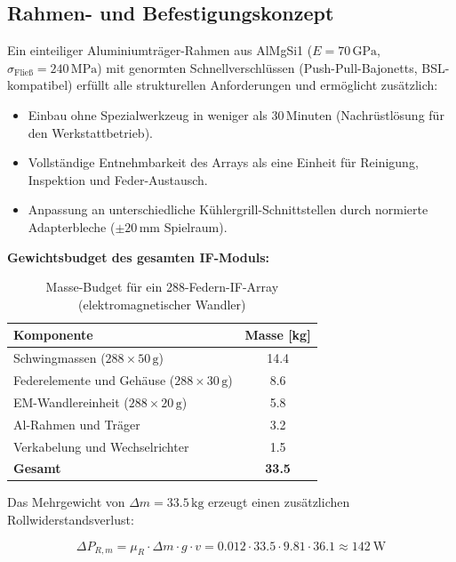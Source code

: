 ﻿\documentclass[12pt, a4paper]{report}
\theoremstyle{definition}
\theoremstyle{remark}
\begin{document}
\subsection{Rahmen- und Befestigungskonzept}

Ein einteiliger Aluminiumträger-Rahmen aus AlMgSi1 ($E = 70\,\text{GPa}$,
$\sigma_{\text{Fließ}} = 240\,\text{MPa}$) mit genormten Schnell\-verschlüssen
(Push-Pull-Bajonetts, BSL-kompatibel) erfüllt alle strukturellen Anforderungen
und ermöglicht zusätzlich:

\begin{itemize}
  \item Einbau ohne Spezialwerkzeug in weniger als 30\,Minuten (Nachrüstlösung
        für den Werkstattbetrieb).
  \item Vollständige Entnehmbarkeit des Arrays als eine Einheit für
        Reinigung, Inspektion und Feder-Austausch.
  \item Anpassung an unterschiedliche Kühlergrill-Schnittstellen durch
        normierte Adapterbleche ($\pm 20\,\text{mm}$ Spielraum).
\end{itemize}

\textbf{Gewichtsbudget des gesamten IF-Moduls:}

\begin{table}[H]
  \centering
  \caption{Masse-Budget für ein 288-Federn-IF-Array (elektromagnetischer Wandler)}
  \label{tab:gewicht}
  \begin{tabular}{lS}
    \toprule
    Komponente & {Masse [kg]} \\
    \midrule
    Schwingmassen ($288 \times 50\,\text{g}$)           & 14.4 \\
    Federelemente und Gehäuse ($288 \times 30\,\text{g}$) & 8.6 \\
    EM-Wandlereinheit ($288 \times 20\,\text{g}$)        & 5.8 \\
    Al-Rahmen und Träger                                 & 3.2 \\
    Verkabelung und Wechselrichter                       & 1.5 \\
    \midrule
    \textbf{Gesamt}                                      & \textbf{33.5} \\
    \bottomrule
  \end{tabular}
\end{table}

Das Mehrgewicht von $\Delta m = 33.5\,\text{kg}$ erzeugt einen zusätzlichen
Rollwiderstandsverlust:

\begin{equation}
  \Delta P_{R,m} = \mu_R \cdot \Delta m \cdot g \cdot v
  = 0.012 \cdot 33.5 \cdot 9.81 \cdot 36.1 \approx \SI{142}{\watt}
  \label{eq:delta_pr_gewicht}
\end{equation}
\end{document}

